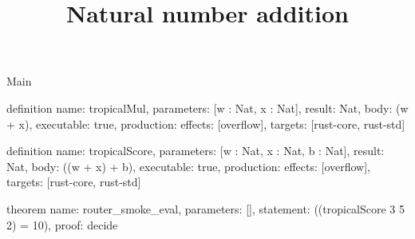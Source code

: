 \begin{lexlean}{Main}
\title{Natural number addition}
\begin{semanticmodule}
definition{
  name: tropicalMul,
  parameters: [w : Nat, x : Nat],
  result: Nat,
  body: (w + x),
  executable: true,
  production: {effects: [overflow], targets: [rust-core, rust-std]}
}

definition{
  name: tropicalScore,
  parameters: [w : Nat, x : Nat, b : Nat],
  result: Nat,
  body: ((w + x) + b),
  executable: true,
  production: {effects: [overflow], targets: [rust-core, rust-std]}
}

theorem{
  name: router_smoke_eval,
  parameters: [],
  statement: ((tropicalScore 3 5 2) = 10),
  proof: decide{}
}
\end{semanticmodule}
\end{lexlean}

